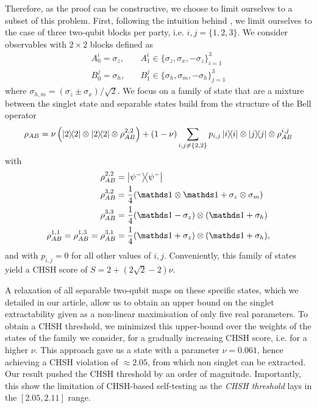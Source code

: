 Therefore, as the proof can be constructive, we choose to limit ourselves to a subset of this problem.
First, following the intuition behind \cite{Coopmans19}, we limit ourselves to the case of three two-qubit blocks per party, i.e. $i,j=\{1,2,3\}$.
We consider observables with $2 \times 2$ blocks defined as 
\begin{equation}
	\begin{split}
		A_0^i = \sigma_z, &\quad A_1^i \in \{\sigma_z,\sigma_x,-\sigma_z\}_{i=1}^3  \\
		B_0^j = \sigma_h, &\quad B_1^j \in \{\sigma_h,\sigma_m,-\sigma_h\}_{j=1}^3 
	\end{split}
\end{equation}
where $\sigma_{h,m} = (\sigma_z\pm\sigma_x)/\sqrt{2}$.
We focus on a family of state that are a mixture between the singlet state and separable states build from the structure of the Bell operator
\begin{equation}
	\rho_{AB} = \nu \left(\ketbra{2} \otimes \ketbra{2} \otimes \rho_{AB}^{2,2}\right) 
	+ (1-\nu) \sum_{i,j \neq \{2,2\}} p_{i,j} \ketbra{i} \otimes \ketbra{j} \otimes \rho_{AB}^{i,j}
\end{equation}
with 
\begin{equation}
	\begin{split}
    \rho_{AB}^{2,2}&=\ketbra{\psi^-} \\
    \rho_{AB}^{3,2}&= \frac{1}{4}(\id\otimes \id +\sigma_z\otimes \sigma_m)\\
    \rho_{AB}^{3,3}&= \frac{1}{4}(\id-\sigma_z)\otimes(\id+\sigma_h)\\
    \rho_{AB}^{1,1}=\rho_{AB}^{1,3}=\rho_{AB}^{3,1} &= \frac{1}{4}(\id+\sigma_z)\otimes(\id+\sigma_h),
	\end{split}	
\end{equation}
and with $p_{i,j} =0$ for all other values of $i,j$.
Conveniently, this family of states yield a CHSH score of $S=2+(2\sqrt{2}-2)\nu$.

A relaxation of all separable two-qubit maps on these specific states, which we detailed in our article, allow us to obtain an upper bound on the singlet extractability given as a non-linear maximisation of only five real parameters.
To obtain a CHSH threshold, we minimized this upper-bound over the weights of the states of the family we consider, for a gradually increasing CHSH score, i.e. for a higher $\nu$.
This approach gave us a state with a parameter $\nu=0.061$, hence achieving a CHSH violation of $\approx 2.05$, from which non singlet can be extracted.
Our result pushed the CHSH threshold by an order of magnitude.
Importantly, this show the limitation of CHSH-based self-testing as the \textit{CHSH threshold} lays in the $[2.05,2.11]$ range.


